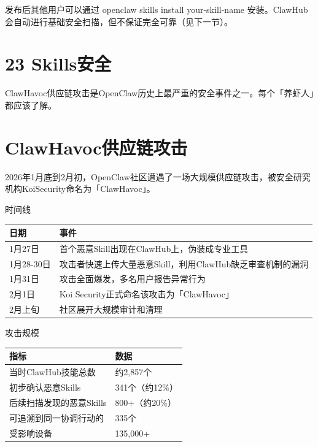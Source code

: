 \documentclass[
  10
]{article}
\newcounter{none} %
\begin{document}
发布后其他用户可以通过 openclaw skills install your-skill-name
安装。ClawHub会自动进行基础安全扫描，但不保证完全可靠（见下一节）。

\section{23 Skills安全}\label{skillsux5b89ux5168}

ClawHavoc供应链攻击是OpenClaw历史上最严重的安全事件之一。每个「养虾人」都应该了解。

\section{ClawHavoc供应链攻击}\label{clawhavocux4f9bux5e94ux94feux653bux51fb}

2026年1月底到2月初，OpenClaw社区遭遇了一场大规模供应链攻击，被安全研究机构KoiSecurity命名为「ClawHavoc」。

时间线

{\def\LTcaptype{none} %
\begin{longtable}[]{@{}|l|l|@{}}
\toprule\noalign{}
\endhead
\bottomrule\noalign{}
\endlastfoot
\hline
日期 & 事件 \\
\hline
1月27日 & 首个恶意Skill出现在ClawHub上，伪装成专业工具 \\
\hline
1月28-30日 &
攻击者快速上传大量恶意Skill，利用ClawHub缺乏审查机制的漏洞 \\
\hline
1月31日 & 攻击全面爆发，多名用户报告异常行为 \\
\hline
2月1日 & Koi Security正式命名该攻击为「ClawHavoc」 \\
\hline
2月上旬 & 社区展开大规模审计和清理 \\
\hline
\end{longtable}
}

攻击规模

{\def\LTcaptype{none} %
\begin{longtable}[]{@{}|l|l|@{}}
\toprule\noalign{}
\endhead
\bottomrule\noalign{}
\endlastfoot
\hline
指标 & 数据 \\
\hline
当时ClawHub技能总数 & 约2,857个 \\
\hline
初步确认恶意Skills & 341个（约12\%） \\
\hline
后续扫描发现的恶意Skills & 800+（约20\%） \\
\hline
可追溯到同一协调行动的 & 335个 \\
\hline
受影响设备 & 135,000+ \\
\hline
\end{longtable}
}
\end{document}
